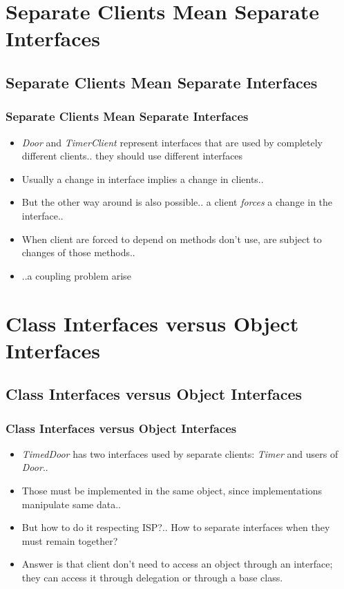\documentclass{beamer}
\begin{document}
\section{Separate Clients Mean Separate Interfaces}
\subsection{Separate Clients Mean Separate Interfaces}
\begin{frame}
  \frametitle{Separate Clients Mean Separate Interfaces}
  \begin{itemize}
	\item<+-> \textit{Door} and \textit{TimerClient} represent interfaces that are used by completely different clients.. they should use different interfaces 
	\item<+-> Usually a change in interface implies a change in clients..
	\item<+-> But the other way around is also possible.. a client \textit{forces} a change in the interface..
	\item<+-> When client are forced to depend on methods don't use, are subject to changes of those methods..
	\item<+-> ..a coupling problem arise
   \end{itemize}
\end{frame}

\section{Class Interfaces versus Object Interfaces}
\subsection{Class Interfaces versus Object Interfaces}
\begin{frame}[containsverbatim]
	\frametitle{Class Interfaces versus Object Interfaces}
  \begin{itemize}
	\item<+-> \textit{TimedDoor} has two interfaces used by separate clients: \textit{Timer} and users of \textit{Door}..
	\item<+-> Those must be implemented in the same object, since implementations manipulate same data..
	\item<+-> But how to do it respecting ISP?.. How to separate interfaces when they must remain together?
	\item<+-> Answer is that client don't need to access an object through an interface; they can access it through delegation or through a base class.
   \end{itemize}
\end{frame}
\end{document}
